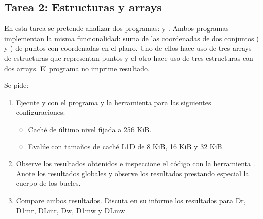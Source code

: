 \clearpage
\subsection{Tarea 2: Estructuras y arrays}

En esta tarea se pretende analizar dos programas:  y
. Ambos programas implementan la misma funcionalidad: suma de las
coordenadas de dos conjuntos ( y ) de puntos con coordenadas en el plano.
Uno de ellos hace uso de tres arrays de estructuras que representan puntos y el otro hace uso de tres estructuras con dos arrays. El programa no imprime resultado.




Se pide: 

\begin{enumerate}

\item Ejecute  y  con el programa  y la herramienta  para las siguientes configuraciones:

\begin{itemize}
\item Caché de último nivel fijada a 256 KiB.
\item Evalúe con tamaños de caché L1D de 8 KiB, 16 KiB y 32 KiB.
\end{itemize}

\item Observe los resultados obtenidos e inspeccione el código con la
herramienta . Anote los resultados globales y observe
los resultados prestando especial la cuerpo de los bucles.

\item Compare ambos resultados.
Discuta en su informe los resultados para Dr, D1mr, DLmr, Dw, D1mw y DLmw

\end{enumerate}

